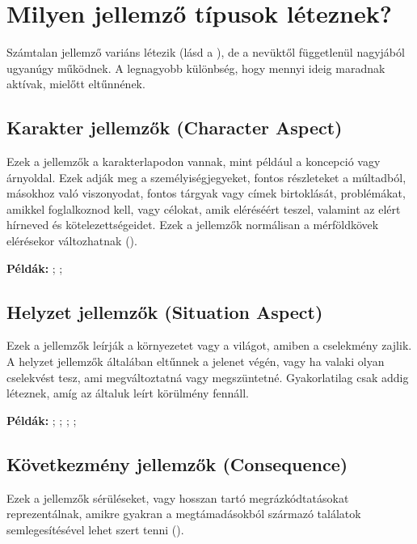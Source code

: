 \label{Milyen jellemző típusok léteznek?}
\section{Milyen jellemző típusok léteznek?}

Számtalan jellemző variáns létezik (lásd a ), de a nevüktől függetlenül nagyjából ugyanúgy működnek. A legnagyobb különbség, hogy mennyi ideig maradnak aktívak, mielőtt eltűnnének.

\subsection[Karakter jellemzők]{Karakter jellemzők (Character Aspect)}

Ezek a jellemzők a karakterlapodon vannak, mint például a koncepció vagy árnyoldal. Ezek adják meg a személyiségjegyeket, fontos részleteket a múltadból, másokhoz való viszonyodat, fontos tárgyak vagy címek birtoklását, problémákat, amikkel foglalkoznod kell, vagy célokat, amik eléréséért teszel, valamint az elért hírneved és kötelezettségeidet. Ezek a jellemzők normálisan a mérföldkövek elérésekor változhatnak ().

\textbf{Példák:} ; ; 

\subsection[Helyzet jellemzők]{Helyzet jellemzők (Situation Aspect)}

Ezek a jellemzők leírják a környezetet vagy a világot, amiben a cselekmény zajlik. A helyzet jellemzők általában eltűnnek a jelenet végén, vagy ha valaki olyan cselekvést tesz, ami megváltoztatná vagy megszüntetné. Gyakorlatilag csak addig léteznek, amíg az általuk leírt körülmény fennáll.

\textbf{Példák:} ; ; ; ; 

\subsection[Következmény jellemzők]{Következmény jellemzők (Consequence)}

Ezek a jellemzők sérüléseket, vagy hosszan tartó megrázkódtatásokat reprezentálnak, amikre gyakran a megtámadásokból származó találatok semlegesítésével lehet szert tenni ().

